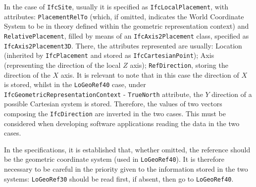 In the case of \texttt{IfcSite}, usually it is specified as \texttt{IfcLocalPlacement}, with attributes: \texttt{PlacementRelTo} (which, if omitted, indicates the World Coordinate System to be in theory defined within the geometric representation context) and \texttt{RelativePlacement}, filled by means of an \texttt{IfcAxis2Placement} class, specified as \texttt{IfcAxis2Placement3D}.
There, the attributes represented are usually: Location (inherited by \texttt{IfcPlacement} and stored as \texttt{IfcCartesianPoint}); Axis (representing the direction of the local $Z$ axis); \texttt{RefDirection}, storing the direction of the $X$ axis.
It is relevant to note that in this case the direction of $X$ is stored, whilst in the \texttt{LoGeoRef40} case, under \texttt{IfcGeometricRepresentationContext} - \texttt{TrueNorth} attribute, the $Y$ direction of a possible Cartesian system is stored.
Therefore, the values of two vectors composing the \texttt{IfcDirection} are inverted in the two cases.
This must be considered when developing software applications reading the data in the two cases.

In the specifications, it is established that, whether omitted, the reference should be the geometric coordinate system (used in \texttt{LoGeoRef40}).
It is therefore necessary to be careful in the priority given to the information stored in the two systems: \texttt{LoGeoRef30} should be read first, if absent, then go to \texttt{LoGeoRef40}.








